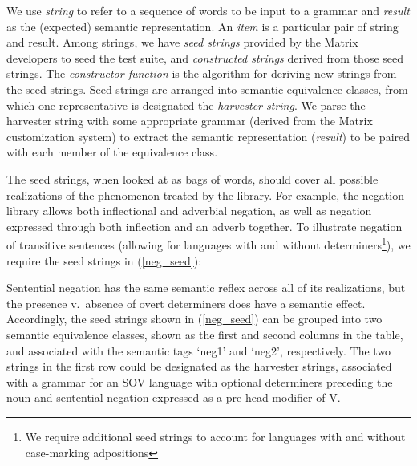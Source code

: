 \documentclass[11pt]{article}
\begin{document}
We use {\it string} to refer to a sequence of words to be input to a
grammar and {\it result} as the (expected) semantic representation.
An {\it item} is a particular pair of string and result.  Among
strings, we have {\it seed strings} provided by the Matrix developers
to seed the test suite, and {\it constructed strings} derived from
those seed strings.  The {\it constructor function} is the algorithm
for deriving new strings from the seed strings. Seed strings are
arranged into semantic equivalence classes, from which one
representative is designated the {\it harvester string}.  We parse the
harvester string with some appropriate grammar (derived from the
Matrix customization system) to extract the semantic representation
({\it result}) to be paired with each member of the equivalence class.

The seed strings, when looked at as bags of words, should cover all
possible realizations of the phenomenon treated by the library. For
example, the negation library allows both inflectional and adverbial
negation, as well as negation expressed through both inflection and an
adverb together.  To illustrate negation of transitive sentences
(allowing for languages with and without determiners\footnote{We
require additional seed strings to account for languages with and
without case-marking adpositions}), we require the seed strings in
(\ref{neg_seed}):

%
Sentential negation has the same semantic reflex across all
of its realizations, but the presence v.\ absence of overt determiners
does have a semantic effect.  Accordingly, the seed strings shown in
(\ref{neg_seed}) can be grouped into two semantic equivalence classes,
shown as the first and second columns in the table, and associated with
the semantic tags `neg1' and `neg2', respectively.  The two strings
in the first row could be designated as the harvester strings, associated
with a grammar for an SOV language with optional determiners preceding
the noun and sentential negation expressed as a pre-head modifier of V.
\end{document}
